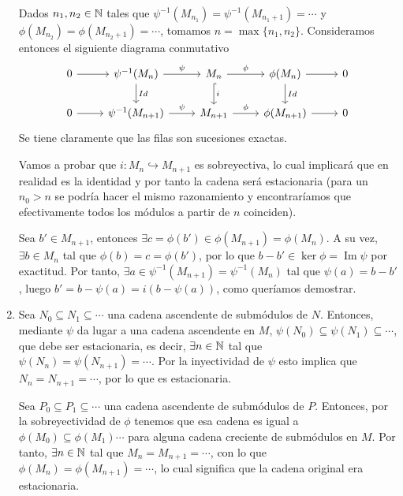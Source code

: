 \documentclass[twoside]{article}
\DeclareMathOperator{\Ima}{Im}
\begin{document}
\begin{solucion}
\begin{enumerate}
Dados $n_1,n_2\in\mathbb{N}$ tales que $\psi^{-1}(M_{n_1})=\psi^{-1}(M_{n_1+1})=\cdots$ y $\phi(M_{n_2})=\phi(M_{n_2+1})=\cdots$, tomamos $n=\max\{n_1,n_2\}$. Consideramos entonces el siguiente diagrama conmutativo
\[
\begin{tikzcd}
0\arrow[r] & \psi^{-1}(M_{n})\arrow[r,"\psi"]\arrow[d, "Id"] & M_n\arrow[r,"\phi"]\arrow[d, hookrightarrow, "i"] & \phi(M_{n})\arrow[d,"Id"]\arrow[r] & 0\\
0\arrow[r] & \psi^{-1}(M_{n+1})\arrow[r,"\psi"]& M_{n+1}\arrow[r,"\phi"] & \phi(M_{n+1})\arrow[r] & 0
\end{tikzcd}
\]
Se tiene claramente que las filas son sucesiones exactas. 

Vamos a probar que $i:M_n\hookrightarrow M_{n+1}$ es sobreyectiva, lo cual implicará que en realidad es la identidad y por tanto la cadena será estacionaria (para un $n_0>n$ se podría hacer el mismo razonamiento y encontraríamos que efectivamente todos los módulos a partir de $n$ coinciden).

Sea $b'\in M_{n+1}$, entonces $\exists c=\phi(b')\in\phi(M_{n+1})=\phi(M_n)$. A su vez, $\exists b\in M_n$ tal que $\phi(b)=c=\phi(b')$, por lo que $b-b'\in\ker\phi=\Ima\psi$ por exactitud. Por tanto, $\exists a\in\psi^{-1}(M_{n+1})=\psi^{-1}(M_n)$ tal que $\psi(a)=b-b'$, luego $b'=b-\psi(a)=i(b-\psi(a))$, como queríamos demostrar.
 
  
\item Sea $N_0\subseteq N_1\subseteq\cdots$ una cadena ascendente de submódulos de $N$. Entonces, mediante $\psi$ da lugar a una cadena ascendente en $M$, $\psi(N_0)\subseteq \psi(N_1)\subseteq\cdots$, que debe ser estacionaria, es decir, $\exists n\in\mathbb{N}$ tal que $\psi(N_n)=\psi(N_{n+1})=\cdots$. Por la inyectividad de $\psi$ esto implica que $N_n=N_{n+1}=\cdots$, por lo que es estacionaria. 

Sea $P_0\subseteq P_1\subseteq\cdots$ una cadena ascendente de submódulos de $P$. Entonces, por la sobreyectividad de $\phi$ tenemos que esa cadena es igual a $\phi(M_0)\subseteq\phi(M_1)\cdots$ para alguna cadena creciente de submódulos en $M$. Por tanto, $\exists n\in\mathbb{N}$ tal que $M_n=M_{n+1}=\cdots$, con lo que $\phi(M_n)=\phi(M_{n+1})=\cdots$, lo cual significa que la cadena original era estacionaria. 
\end{enumerate}
\end{solucion}

\newpage
\end{document}
